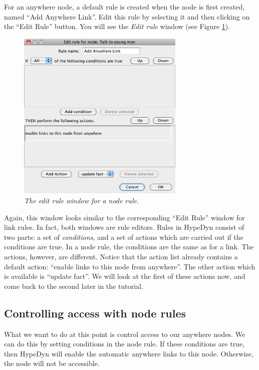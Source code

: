 \documentclass{article}
\begin{document}
For an anywhere node, a default rule is created when the node is first created,
named ``Add Anywhere Link''. Edit this rule by selecting it and then clicking
on the ``Edit Rule'' button. You will see the \textit{Edit rule} window (see
Figure \ref{fig:tut3:edit_rule}).

\begin{figure}[h]
  \centering
  \includegraphics[width=8cm]{images/hypedyn-tutorial-3-figure-5}
  \caption{\textit{The edit rule window for a node rule.}}
  \label{fig:tut3:edit_rule}
\end{figure} 

Again, this window looks similar to the corresponding ``Edit Rule'' window for
link rules. In fact, both windows are rule editors. Rules in HypeDyn consist of
two parts: a set of \textit{conditions}, and a set of actions which are carried
out if the conditions are true. In a node rule, the conditions are the same as
for a link. The actions, however, are different. Notice that the action list
already contains a default action: ``enable links to this node from anywhere''.
The other action which is available is ``update fact''. We will look at the first
of these actions now, and come back to the second later in the tutorial.

\subsection{Controlling access with node rules}

What we want to do at this point is control access to our anywhere nodes. We
can do this by setting conditions in the node rule. If these conditions are
true, then HypeDyn will enable the automatic anywhere links to this node.
Otherwise, the node will not be accessible.
\end{document}
